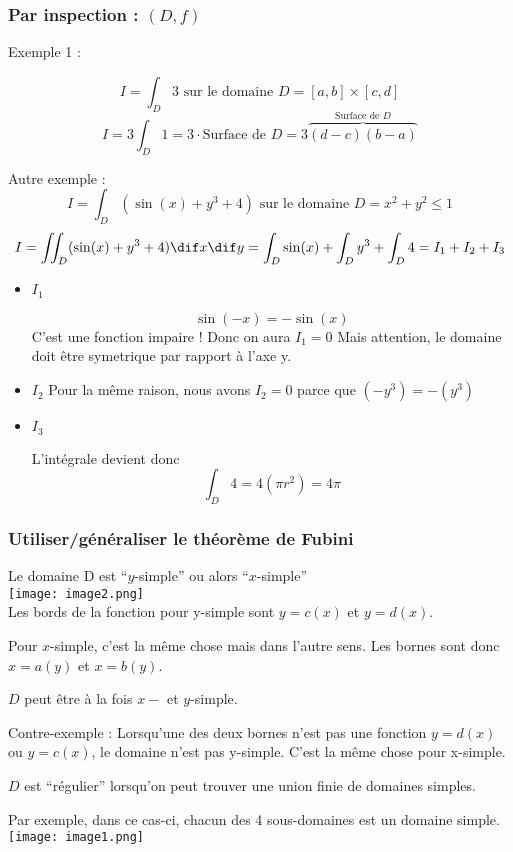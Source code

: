 \subsubsection{Par inspection : $(D,f)$}
Exemple 1 :

\[I=\int_D 3 \text{ sur le domaine }D=[a,b]\times[c,d]\]
\[I=3\int_D 1 = 3 \cdot \text{Surface de }D = 3\overbrace{(d-c)(b-a)}^{\text{Surface de }D} \]

Autre exemple :
\[I = \int_D ( \sin(x) +y^3 + 4 )\text{ sur le domaine } D=x^2+y^2\le 1\]
\[I = \iint_D(\sin(x)+y^3+4)\dif x\dif y = \int_D \sin(x) + \int_D y^3 + \int_D 4 = I_1 + I_2 + I_3\]
\begin{itemize}

\item \textbf{$I_1$}




\[\sin(-x) = -\sin(x) \]
C'est une fonction impaire !
Donc on aura \emph{$I_1=0$}
Mais attention, le domaine doit être symetrique par rapport à l'axe y.
\item \textbf{$I_2$}
Pour la même raison, nous avons $I_2=0$ parce que $(-y^3) = -(y^3)$

\item \textbf{$I_3$}

L'intégrale devient donc
\[\int_D 4 = 4(\pi r^2) = 4\pi \]

\end{itemize}
\subsubsection{Utiliser/généraliser le théorème de Fubini}

Le domaine D est ``$y$-simple'' ou alors ``$x$-simple''\\
\texttt{[image: image2.png]}
\\
Les bords de la fonction pour y-simple sont $y=c(x)$ et $y=d(x)$.

Pour $x$-simple, c'est la même chose mais dans l'autre sens. Les bornes sont donc $x=a(y)$ et $x=b(y)$.
\begin{myrem}
$D$ peut être à la fois $x-$ et $y$-simple.
\end{myrem}
\begin{myrem}
Contre-exemple : Lorsqu'une des deux bornes n'est pas une fonction $y=d(x)$ ou $y=c(x)$, le domaine n'est pas y-simple. C'est la même chose pour x-simple.

\end{myrem}

\begin{myrem}
$D$ est ``régulier'' lorsqu'on peut trouver une union finie de domaines simples.


Par exemple, dans ce cas-ci, chacun des 4 sous-domaines est un domaine simple.\\
\texttt{[image: image1.png]}

\end{myrem}
